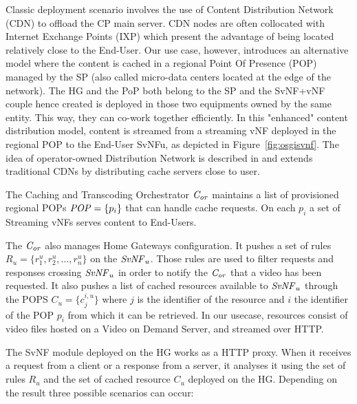 Classic deployment scenario involves the use of Content Distribution Network (CDN) to offload the CP main server.
CDN nodes are often collocated with Internet Exchange Points (IXP) which present the advantage of being located relatively close to the End-User. Our use case, however, introduces an alternative model where the content is cached in a regional Point Of Presence (POP) managed by the SP (also called micro-data centers located at the edge of the network). The HG and the PoP both belong to the SP and the SvNF+vNF couple hence created is deployed in those two equipments owned by the same entity. This way, they can co-work together efficiently. In this "enhanced" content distribution model, content is streamed from a streaming vNF deployed in the regional POP to the End-User SvNFu, as depicted in Figure~\ref{fig:osgisvnf}.
The idea of operator-owned Distribution Network is described in \cite{spagna_design_2013} and extends traditional CDNs by distributing cache servers close to user.

The Caching and Transcoding Orchestrator  $\mathit{C_{or}}$ maintains a list of provisioned regional POPs \(\mathit{POP}=\{p_{i}\}\) that can handle cache requests. On each $p_{i}$ a set of Streaming vNFs serves content to End-Users.

The $\mathit{C_{or}}$ also manages Home Gateways configuration. It pushes a set of rules \(R_{u}=\{r^{u}_{1},r^{u}_{2},...,r^{u}_{n}\}\) on the $\mathit{SvNF}_{u}$. 
Those rules are used to filter requests and responses crossing $\mathit{SvNF}_{u}$ in order to notify the $\mathit{C_{or}}$ that a video has been requested.
It also pushes a list of cached resources available to $\mathit{SvNF}_{u}$ through the POPS $C_{u}=\{c^{i,u}_{j} \}$ where $j$ is the identifier of the resource and $i$ the identifier of the POP $p_{i}$ from which it can be retrieved. In our usecase, resources consist of video files hosted on a Video on Demand Server, and streamed over HTTP.

The SvNF module deployed on the HG works as a HTTP proxy.
When it receives a request from a client or a response from a server, it analyses it using the set of rules \(R_{u}\) and the set of cached resource $C_{u}$ deployed on the HG.
Depending on the result three possible scenarios can occur:



